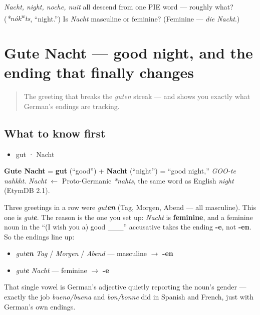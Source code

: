 \begin{tcolorbox}[breakable,colback=teal!4,colframe=teal!35!black,title={Before you move on}]
\emph{Nacht, night, noche, nuit} all descend from one PIE word — roughly what? (\emph{*nók\textsuperscript{w}ts}, \textquotedblleft{}night.\textquotedblright{}) Is \emph{Nacht} masculine or feminine? (Feminine — \emph{die Nacht}.)
\end{tcolorbox}
\section[Gute Nacht]{Gute Nacht — good night, and the ending that finally changes}

\label{lesson:GE-C01-gute-nacht}



\begin{quote}
The greeting that breaks the \emph{guten} streak — and shows you exactly what German's endings are tracking.
\end{quote}

\subsection*{What to know first}
\begin{itemize}
\raggedright
  \item gut · Nacht
\end{itemize}

\begin{cousinweb}
\textbf{Gute Nacht} = \textbf{gut} (\textquotedblleft{}good\textquotedblright{}) + \textbf{Nacht} (\textquotedblleft{}night\textquotedblright{}) = \textquotedblleft{}good night,\textquotedblright{} \emph{GOO-te nahkht}. \emph{Nacht} $\leftarrow$ Proto-Germanic \emph{*nahts}, the same word as English \emph{night} (EtymDB 2.1).
\end{cousinweb}

\begin{grammarlens}[title={Grammar Lens: \emph{gute}, not \emph{guten}}]
Three greetings in a row were \emph{gut\textbf{en}} (Tag, Morgen, Abend — all masculine). This one is \emph{gut\textbf{e}}. The reason is the one you set up: \emph{Nacht} is \textbf{feminine}, and a feminine noun in the \textquotedblleft{}(I wish you a) good \_\_\_\textquotedblright{} accusative takes the ending \textbf{-e}, not \textbf{-en}. So the endings line up:

\begin{itemize}
\raggedright
  \item \emph{gut\textbf{en} Tag} / \emph{Morgen} / \emph{Abend} — masculine $\to$ \textbf{-en}
  \item \emph{gut\textbf{e} Nacht} — feminine $\to$ \textbf{-e}
\end{itemize}

That single vowel is German's adjective quietly reporting the noun's gender — exactly the job \emph{bueno/buena} and \emph{bon/bonne} did in Spanish and French, just with German's own endings.
\end{grammarlens}

